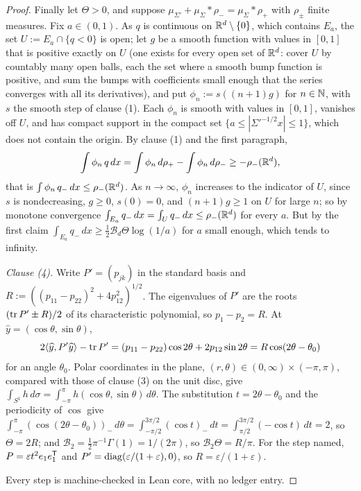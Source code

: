 \begin{proof}
Finally let $\Theta > 0$, and suppose $\mu_{\Sigma'} + \mu_\Sigma * \rho_- = \mu_\Sigma * \rho_+$ with
$\rho_\pm$ finite measures. Fix $a \in (0,1)$. As $q$ is continuous on $\mathbb{R}^d \setminus \{0\}$, which
contains $E_a$, the set $U := E_a \cap \{q < 0\}$ is open; let $g$ be a smooth function with values
in $[0,1]$ that is positive exactly on $U$ (one exists for every open set of $\mathbb{R}^d$: cover $U$ by
countably many open balls, each the set where a smooth bump function is positive, and sum the bumps
with coefficients small enough that the series converges with all its derivatives), and put
$\phi_n := s((n+1)g)$ for $n \in \mathbb{N}$, with $s$ the smooth step of clause (1). Each
$\phi_n$ is smooth with values in $[0,1]$, vanishes off $U$, and has compact support in the compact
set $\{a \le |\Sigma'^{-1/2}x| \le 1\}$, which does not contain the origin. By clause (1) and the
first paragraph,
\[
  \int\phi_n\,q\,dx = \int\phi_n\,d\rho_+ - \int\phi_n\,d\rho_- \ge -\rho_-(\mathbb{R}^d) ,
\]
that is $\int\phi_n\,q_-\,dx \le \rho_-(\mathbb{R}^d)$. As $n \to \infty$, $\phi_n$ increases to the
indicator of $U$, since $s$ is nondecreasing, $g \ge 0$, $s(0) = 0$, and $(n+1)g \ge 1$ on $U$ for
large $n$; so by monotone convergence $\int_{E_a}q_-\,dx = \int_Uq_-\,dx \le \rho_-(\mathbb{R}^d)$
for every $a$. But by the first claim $\int_{E_a}q_-\,dx \ge \tfrac12\mathcal{B}_d\Theta\log(1/a)$ for
$a$ small enough, which tends to infinity.

\emph{Clause (4).} Write $P' = (p_{jk})$ in the standard basis and
$R := ((p_{11} - p_{22})^2 + 4p_{12}^2)^{1/2}$. The eigenvalues of $P'$ are the roots
$(\operatorname{tr} P' \pm R)/2$ of its characteristic polynomial, so $p_1 - p_2 = R$. At
$\widehat y = (\cos\theta, \sin\theta)$,
\[
  2\langle\widehat y,P'\widehat y\rangle - \operatorname{tr} P' = (p_{11} - p_{22})\cos2\theta + 2p_{12}\sin2\theta
  = R\cos(2\theta - \theta_0)
\]
for an angle $\theta_0$. Polar coordinates in the plane, $(r,\theta) \in (0,\infty)\times(-\pi,\pi)$,
compared with those of clause (3) on the unit disc, give
$\int_{S^1}h\,d\sigma = \int_{-\pi}^{\pi}h(\cos\theta,\sin\theta)\,d\theta$. The substitution
$t = 2\theta - \theta_0$ and the periodicity of $\cos$ give
$\int_{-\pi}^{\pi}(\cos(2\theta - \theta_0))_-\,d\theta = \int_{-\pi/2}^{3\pi/2}(\cos t)_-\,dt =
\int_{\pi/2}^{3\pi/2}(-\cos t)\,dt = 2$, so $\Theta = 2R$; and
$\mathcal{B}_2 = \tfrac12\pi^{-1}\Gamma(1) = 1/(2\pi)$, so $\mathcal{B}_2\Theta = R/\pi$. For the step
named, $P = \varepsilon t^2e_1e_1^{\mathsf{T}}$ and $P' = \operatorname{diag}(\varepsilon/(1+\varepsilon), 0)$, so
$R = \varepsilon/(1+\varepsilon)$.

Every step is machine-checked in Lean core, with no ledger entry.
\end{proof}

